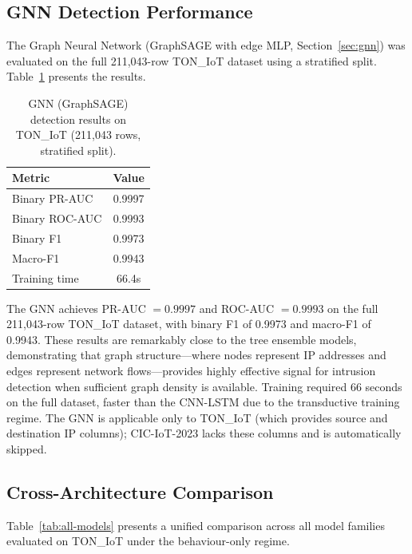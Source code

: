 \documentclass[12pt,a4paper]{report}
\begin{document}
\subsection{GNN Detection Performance}
\label{sec:gnn-results}

The Graph Neural Network (GraphSAGE with edge MLP, Section~\ref{sec:gnn}) was evaluated on the full 211,043-row TON\_IoT dataset using a stratified split. Table~\ref{tab:gnn} presents the results.

\begin{table}[H]
\centering
\caption{GNN (GraphSAGE) detection results on TON\_IoT (211,043 rows, stratified split).}
\label{tab:gnn}
\begin{tabular}{lc}
\toprule
\textbf{Metric} & \textbf{Value} \\
\midrule
Binary PR-AUC & 0.9997 \\
Binary ROC-AUC & 0.9993 \\
Binary F1 & 0.9973 \\
Macro-F1 & 0.9943 \\
Training time & 66.4s \\
\bottomrule
\end{tabular}
\end{table}

The GNN achieves PR-AUC $= 0.9997$ and ROC-AUC $= 0.9993$ on the full 211,043-row TON\_IoT dataset, with binary F1 of 0.9973 and macro-F1 of 0.9943. These results are remarkably close to the tree ensemble models, demonstrating that graph structure---where nodes represent IP addresses and edges represent network flows---provides highly effective signal for intrusion detection when sufficient graph density is available. Training required 66 seconds on the full dataset, faster than the CNN-LSTM due to the transductive training regime. The GNN is applicable only to TON\_IoT (which provides source and destination IP columns); CIC-IoT-2023 lacks these columns and is automatically skipped.

\subsection{Cross-Architecture Comparison}
\label{sec:arch-comparison}

Table~\ref{tab:all-models} presents a unified comparison across all model families evaluated on TON\_IoT under the behaviour-only regime.
\end{document}
